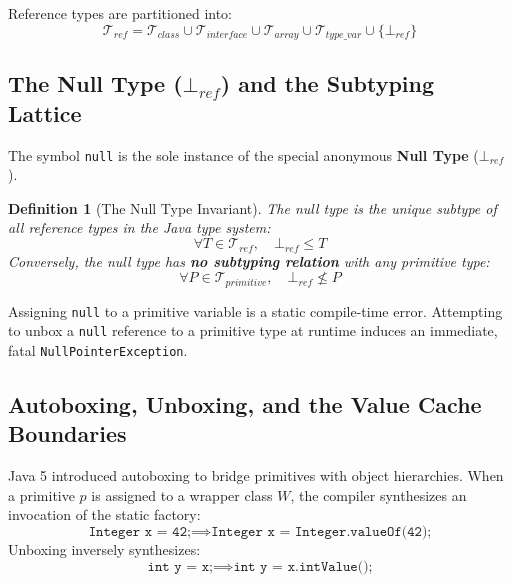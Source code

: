 \documentclass[10pt,journal,compsoc,onecolumn]{IEEEtran}
\newtheorem{definition}[theorem]{Definition}
\begin{document}
Reference types are partitioned into:
\begin{equation}
\mathcal{T}_{ref} = \mathcal{T}_{class} \cup \mathcal{T}_{interface} \cup \mathcal{T}_{array} \cup \mathcal{T}_{type\_var} \cup \{ \bot_{ref} \}
\end{equation}

\subsection{The Null Type ($\bot_{ref}$) and the Subtyping Lattice}
The symbol \texttt{null} is the sole instance of the special anonymous \textbf{Null Type} ($\bot_{ref}$).
\begin{definition}[The Null Type Invariant]
The null type is the unique subtype of all reference types in the Java type system:
\begin{equation}
\forall T \in \mathcal{T}_{ref}, \quad \bot_{ref} \le T
\end{equation}
Conversely, the null type has \textbf{no subtyping relation} with any primitive type:
\begin{equation}
\forall P \in \mathcal{T}_{primitive}, \quad \bot_{ref} \not\le P
\end{equation}
\end{definition}
Assigning \texttt{null} to a primitive variable is a static compile-time error. Attempting to unbox a \texttt{null} reference to a primitive type at runtime induces an immediate, fatal \texttt{NullPointerException}.

\subsection{Autoboxing, Unboxing, and the Value Cache Boundaries}
Java 5 introduced autoboxing to bridge primitives with object hierarchies. When a primitive $p$ is assigned to a wrapper class $W$, the compiler synthesizes an invocation of the static factory:
\begin{equation}
\texttt{Integer x = 42;} \implies \texttt{Integer x = Integer.valueOf(42);}
\end{equation}
Unboxing inversely synthesizes:
\begin{equation}
\texttt{int y = x;} \implies \texttt{int y = x.intValue();}
\end{equation}
\end{document}
